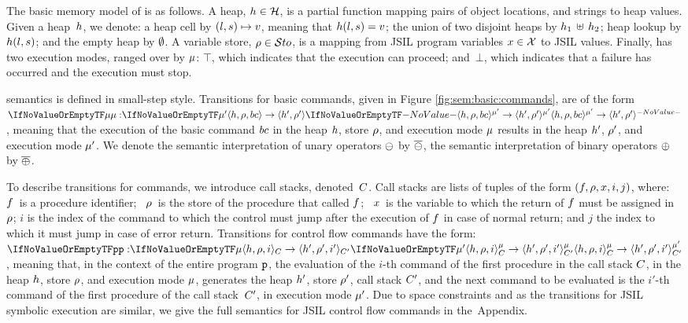 The basic memory model of \jsil is as follows. 
A \jsil heap, $h \in {\mathcal H}$, is a partial function mapping pairs of  object locations, and strings to heap values. 
 Given a heap~$h$, we denote: a heap cell by $(l, s) \mapsto v$, meaning that  $h(l,s) = v$; the union of two disjoint heaps by $h_1 \, \uplus \, h_2$; heap lookup by $h(l, s)$; and the empty heap by $\emptyset$.
A \jsil variable store, $\rho \in \mathcal{S}to$, is a mapping from JSIL program variables $x \in \mathcal{X}$ to JSIL values. Finally, \jsil has two execution modes, ranged over by $\mu$: $\top$, which indicates that the execution can proceed; and~$\bot$, which indicates that a failure has occurred and the execution must stop. 

\jsil semantics is defined in small-step style. Transitions for basic commands, given in Figure \ref{fig:sem:basic:commands}, are of the form $\semtrans[\mode][\mode']{\heap, \store, \bcmd}{\heap', \store'}$, meaning that the execution of the basic command $bc$ in the heap $h$, store $\rho$, and execution mode $\mu$ results in the heap $h'$, $\rho'$, and execution mode $\mu'$. 
We denote the semantic interpretation of unary operators $\ominus$ by $\overline{\ominus}$, the semantic interpretation of binary operators $\oplus$ by $\overline{\oplus}$.

To describe transitions for \jsil commands, we introduce call stacks, denoted~$C$.
Call stacks are lists of tuples of the form $(f, \rho, x, i, j)$, where: 
~$f$~is a procedure identifier;
~$\rho$~is the store of the procedure that called $f$; 
~$x$~is the variable to which the return of $f$ must be assigned in $\rho$; 
 $i$ is the index 
of the command to which the control must jump after the execution of $f$ in 
case of normal return; 
and  $j$ the index to which it must jump in case of 
error return. Transitions for control flow commands have the form:  $\semtrans[\prog][\mode][\mode']{\heap, \store, i}{\heap', \store', i'}[\ctx][\ctx']$, meaning that, in the context of the entire program $\mathtt{p}$, the evaluation of the $i$-th command of the first procedure in the call stack $C$, in
the heap $h$, store $\rho$, and execution mode $\mu$, generates the heap $h'$, store $\rho'$, call stack $C'$,   
and the next command to be evaluated is the $i'$-th command of the first procedure of the call stack~$C'$, in execution mode $\mu'$. Due to space constraints and as the transitions for JSIL symbolic execution are  similar, we give the full semantics for JSIL control flow commands in the~Appendix. %

